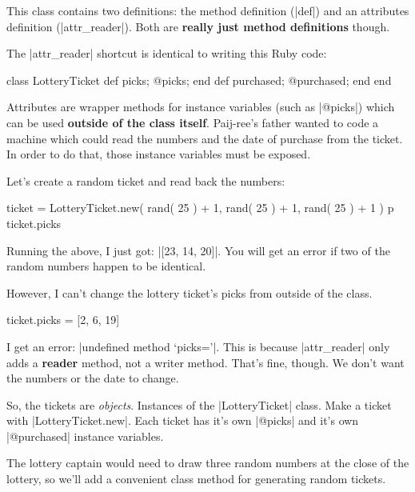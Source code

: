 \documentclass[12pt,twoside]{report}
\begin{document}
This class contains two definitions: the method definition
(\rubyinline|def|) and an attributes definition
(\rubyinline|attr_reader|).  Both are {\bf really just
  method definitions} though.

The \rubyinline|attr_reader| shortcut is identical to
writing this Ruby code:


\begin{rubycode}

 class LotteryTicket
   def picks; @picks; end
   def purchased; @purchased; end
 end

\end{rubycode}


Attributes are wrapper methods for instance variables (such as
\rubyinline|@picks|) which can be used {\bf outside of
  the class itself}.  Paij-ree's father wanted to code a machine which
could read the numbers and the date of purchase from the ticket.  In
order to do that, those instance variables must be exposed.

Let's create a random ticket and read back the numbers:


\begin{rubycode}

 ticket = LotteryTicket.new( rand( 25 ) + 1,
             rand( 25 ) + 1, rand( 25 ) + 1 )
 p ticket.picks

\end{rubycode}


Running the above, I just got: 
\rubyinline|[23, 14, 20]|.  
You will get an error if two of the random numbers happen to
be identical.

However, I can't change the lottery ticket's picks from outside of the
class.


\begin{rubycode}

 ticket.picks = [2, 6, 19]

\end{rubycode}


I get an error: 
\rubyinline|undefined method `picks='|. 
This is because \rubyinline|attr_reader|
only adds a {\bf reader} method, not a writer method. That's fine,
though.  We don't want the numbers or the date to change.

So, the tickets are {\em objects}.  Instances of the
\rubyinline|LotteryTicket| class.  Make a ticket with
\rubyinline|LotteryTicket.new|.  Each ticket has it's
own \rubyinline|@picks| and it's own
\rubyinline|@purchased| instance variables.

The lottery captain would need to draw three random numbers at the
close of the lottery, so we'll add a convenient class method for
generating random tickets.
\end{document}
